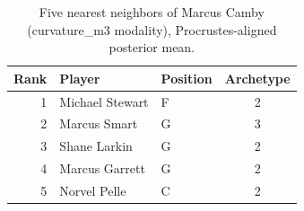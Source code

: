 \begin{table}[htbp]
  \centering\small
  \begin{tabular}{rllc}
    \toprule
    Rank & Player & Position & Archetype \\
    \midrule
    1 & Michael Stewart & F & 2 \\
    2 & Marcus Smart & G & 3 \\
    3 & Shane Larkin & G & 2 \\
    4 & Marcus Garrett & G & 2 \\
    5 & Norvel Pelle & C & 2 \\
    \bottomrule
  \end{tabular}
  \caption{Five nearest neighbors of Marcus Camby (curvature_m3 modality), Procrustes-aligned posterior mean.}
  \label{tab:Marcus_Camby_neighbors_curvature_m3}
\end{table}

